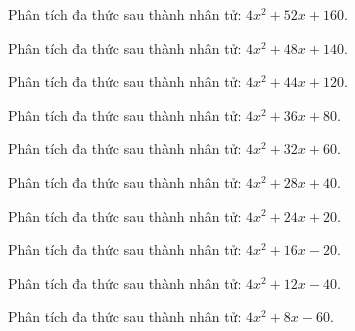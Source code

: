\begin{bt}
	Phân tích đa thức sau thành nhân tử: $4 x^2 + 52 x + 160$.
\end{bt}
\begin{bt}
	Phân tích đa thức sau thành nhân tử: $4 x^2 + 48 x + 140$.
\end{bt}
\begin{bt}
	Phân tích đa thức sau thành nhân tử: $4 x^2 + 44 x + 120$.
\end{bt}
\begin{bt}
	Phân tích đa thức sau thành nhân tử: $4 x^2 + 36 x + 80$.
\end{bt}
\begin{bt}
	Phân tích đa thức sau thành nhân tử: $4 x^2 + 32 x + 60$.
\end{bt}
\begin{bt}
	Phân tích đa thức sau thành nhân tử: $4 x^2 + 28 x + 40$.
\end{bt}
\begin{bt}
	Phân tích đa thức sau thành nhân tử: $4 x^2 + 24 x + 20$.
\end{bt}
\begin{bt}
	Phân tích đa thức sau thành nhân tử: $4 x^2 + 16 x - 20$.
\end{bt}
\begin{bt}
	Phân tích đa thức sau thành nhân tử: $4 x^2 + 12 x - 40$.
\end{bt}
\begin{bt}
	Phân tích đa thức sau thành nhân tử: $4 x^2 + 8 x - 60$.
\end{bt}
